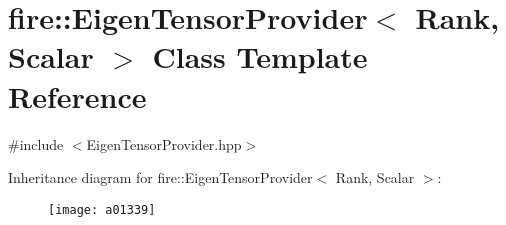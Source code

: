 \hypertarget{a01339}{}\section{fire\+:\+:Eigen\+Tensor\+Provider$<$ Rank, Scalar $>$ Class Template Reference}
\label{a01339}


{\ttfamily \#include $<$Eigen\+Tensor\+Provider.\+hpp$>$}

Inheritance diagram for fire\+:\+:Eigen\+Tensor\+Provider$<$ Rank, Scalar $>$\+:\begin{figure}[H]
\begin{center}
\leavevmode
\texttt{[image: a01339]}
\end{center}
\end{figure}
